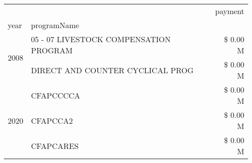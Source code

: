 \begin{tabular}{llr}
\toprule
 &  & payment \\
year & programName &  \\
\midrule
\multirow[t]{2}{*}{2008} & 05 - 07 LIVESTOCK COMPENSATION PROGRAM & \$ 0.00 M \\
 & DIRECT AND COUNTER CYCLICAL PROG & \$ 0.00 M \\
\cline{1-3}
\multirow[t]{3}{*}{2020} & CFAPCCCCA & \$ 0.00 M \\
 & CFAPCCA2 & \$ 0.00 M \\
 & CFAPCARES & \$ 0.00 M \\
\cline{1-3}
\bottomrule
\end{tabular}
